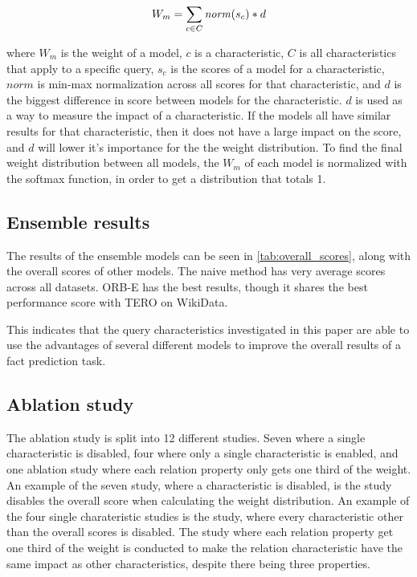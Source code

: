 \begin{equation} 
W_m = \sum\limits_{c \in C} \mathit{norm}(s_c) * d
\end{equation}

\noindent
where $W_m$ is the weight of a model, $c$ is a characteristic, $C$ is all characteristics that apply to a specific query, $s_c$ is the scores of a model for a characteristic, $\mathit{norm}$ is min-max normalization across all scores for that characteristic, and $d$ is the biggest difference in score between models for the characteristic.
$d$ is used as a way to measure the impact of a characteristic. If the models all have similar results for that characteristic, then it does not have a large impact on the score, and $d$ will lower it's importance for the the weight distribution.
To find the final weight distribution between all models, the $W_m$ of each model is normalized with the softmax function, in order to get a distribution that totals 1. 

\subsection{Ensemble results}
The results of the ensemble models can be seen in \autoref{tab:overall_scores}, along with the overall scores of other models.
The naive method has very average scores across all datasets.
ORB-E has the best results, though it shares the best performance score with TERO on WikiData.



This indicates that the query characteristics investigated in this paper are able to use the advantages of several different models to improve the overall results of a fact prediction task.

\subsection{Ablation study}
The ablation study is split into 12 different studies. Seven where a single characteristic is disabled, four where only a single characteristic is enabled, and one ablation study where each relation property only gets one third of the weight.
An example of the seven study, where a characteristic is disabled, is the  study disables the overall score when calculating the weight distribution. 
An example of the four single charateristic studies is the  study, where every characteristic other than the overall scores is disabled. 
The study where each relation property get one third of the weight is conducted to make the relation characteristic have the same impact as other characteristics, despite there being three properties.

